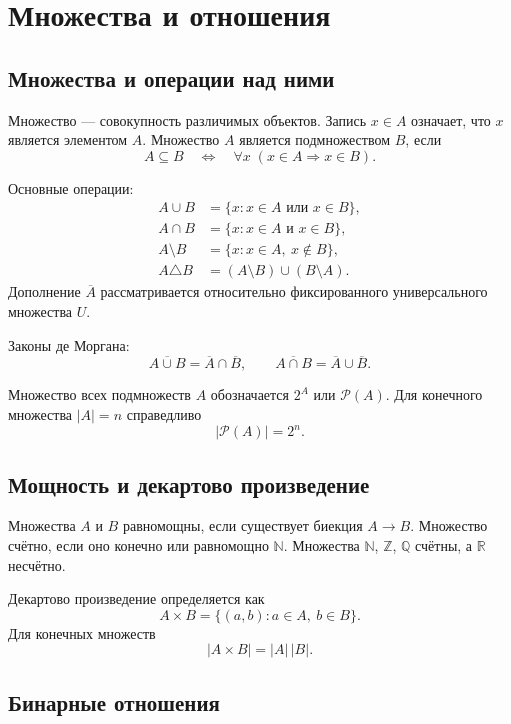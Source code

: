\section{Множества и отношения}
\label{sec:sets-relations}

\subsection{Множества и операции над ними}

Множество --- совокупность различимых объектов. Запись $x\in A$ означает, что
$x$ является элементом $A$. Множество $A$ является подмножеством $B$, если
\[
    A\subseteq B
    \quad\Longleftrightarrow\quad
    \forall x\;(x\in A\Rightarrow x\in B).
\]

Основные операции:
\[
\begin{aligned}
A\cup B&=\{x:x\in A\text{ или }x\in B\},\\
A\cap B&=\{x:x\in A\text{ и }x\in B\},\\
A\setminus B&=\{x:x\in A,\ x\notin B\},\\
A\triangle B&=(A\setminus B)\cup(B\setminus A).
\end{aligned}
\]
Дополнение $\overline A$ рассматривается относительно фиксированного
универсального множества $U$.

Законы де Моргана:
\[
    \overline{A\cup B}=\overline A\cap\overline B,
    \qquad
    \overline{A\cap B}=\overline A\cup\overline B.
\]

Множество всех подмножеств $A$ обозначается $2^A$ или $\mathcal P(A)$.
Для конечного множества $|A|=n$ справедливо
\[
    |\mathcal P(A)|=2^n.
\]

\subsection{Мощность и декартово произведение}

Множества $A$ и $B$ равномощны, если существует биекция $A\to B$.
Множество счётно, если оно конечно или равномощно $\mathbb N$.
Множества $\mathbb N$, $\mathbb Z$, $\mathbb Q$ счётны, а $\mathbb R$ несчётно.

Декартово произведение определяется как
\[
    A\times B=\{(a,b):a\in A,\ b\in B\}.
\]
Для конечных множеств
\[
    |A\times B|=|A|\,|B|.
\]

\subsection{Бинарные отношения}

